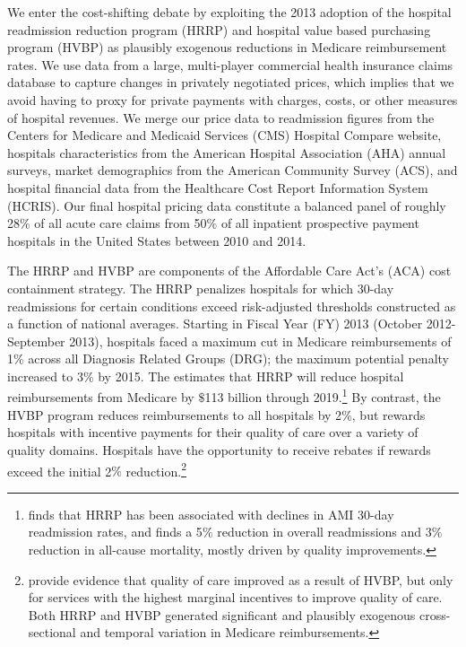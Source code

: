 \documentclass[12pt]{article}
\begin{document}
We enter the cost-shifting debate by exploiting the 2013 adoption of the hospital readmission reduction program (HRRP) and hospital value based purchasing program (HVBP) as plausibly exogenous reductions in Medicare reimbursement rates. We use data from a large, multi-player commercial health insurance claims database to capture changes in privately negotiated prices, which implies that we avoid having to proxy for private payments with charges, costs, or other measures of hospital revenues. We merge our price data to readmission figures from the Centers for Medicare and Medicaid Services (CMS) Hospital Compare website, hospitals characteristics from the American Hospital Association (AHA) annual surveys, market demographics from the American Community Survey (ACS), and hospital financial data from the Healthcare Cost Report Information System (HCRIS). Our final hospital pricing data constitute a balanced panel of roughly 28$\%$ of all acute care claims from 50$\%$ of all inpatient prospective payment hospitals in the United States between 2010 and 2014.

The HRRP and HVBP are components of the Affordable Care Act's (ACA) cost containment strategy.  The HRRP penalizes hospitals for which 30-day readmissions for certain conditions exceed risk-adjusted thresholds constructed as a function of national averages.  Starting in Fiscal Year (FY) 2013 (October 2012-September 2013), hospitals faced a maximum cut in Medicare reimbursements of 1$\%$ across all Diagnosis Related Groups (DRG); the maximum potential penalty increased to 3$\%$ by 2015.  The \cite{cbo2010} estimates that HRRP will reduce hospital reimbursements from Medicare by $\$$113 billion through 2019.\footnote{\citet{mellor2016} finds that HRRP has been associated with declines in AMI 30-day readmission rates, and \citet{gupta2016} finds a 5$\%$ reduction in overall readmissions and 3$\%$ reduction in all-cause mortality, mostly driven by quality improvements.}  By contrast, the HVBP program reduces reimbursements to all hospitals by 2$\%$, but rewards hospitals with incentive payments for their quality of care over a variety of quality domains.  Hospitals have the opportunity to receive rebates if rewards exceed the initial 2$\%$ reduction.\footnote{\citet{norton2016} provide evidence that quality of care improved as a result of HVBP, but only for services with the highest marginal incentives to improve quality of care.  Both HRRP and HVBP generated significant and plausibly exogenous cross-sectional and temporal variation in Medicare reimbursements.}
\end{document}

